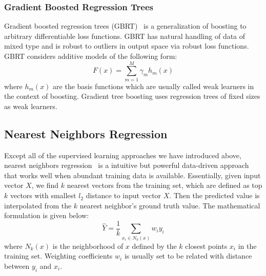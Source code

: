 \subsubsection{Gradient Boosted Regression Trees}
\label{ssub:gradient_boost}
Gradient boosted regression trees (GBRT)~\cite{friedman2001} is a
generalization of boosting to arbitrary differentiable loss functions. GBRT has
natural handling of data of mixed type and is robust to outliers in output
space via robust loss functions. GBRT considers additive models of the
following form:
\begin{equation}
	F(x) = \sum\limits_{m=1}^{M} \gamma_m h_m(x)
\end{equation}
where $h_m(x)$ are the basis functions which are usually called weak learners
in the context of boosting. Gradient tree boosting uses regression trees of
fixed sizes as weak learners.

\subsection{Nearest Neighbors Regression}
\label{sub:nearest_neighbor}
Except all of the supervised learning approaches we have introduced above,
nearest neighbors regression~\cite{hardle1990} is a intuitive but powerful
data-driven approach that works well when abundant training data is available.
Essentially, given input vector $X$, we find $k$ nearest vectors from the
training set, which are defined as top $k$ vectors with smallest $l_2$ distance
to input vector $X$. Then the predicted value is interpolated from the $k$
nearest neighbor's ground truth value. The mathematical formulation is given
below:
\begin{equation}
  \hat{Y} = \frac{1}{k} \sum \limits_{x_i \in N_k(x)} w_i y_i
\end{equation}
where $N_k(x)$ is the neighborhood of $x$ defined by the $k$ closest points
$x_i$ in the training set. Weighting coefficients $w_i$ is usually set to be
related with distance between $y_i$ and $x_i$.
